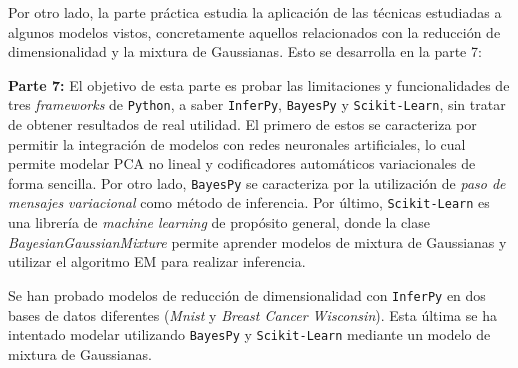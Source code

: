 Por otro lado, la parte práctica estudia la aplicación de las técnicas estudiadas a algunos modelos vistos, concretamente aquellos relacionados con la reducción de dimensionalidad y la mixtura de Gaussianas. Esto se desarrolla en la parte 7:

\textbf{Parte 7:} El objetivo de esta parte es probar las limitaciones y funcionalidades de tres \textit{frameworks} de \texttt{Python}, a saber \texttt{InferPy}, \texttt{BayesPy} y \texttt{Scikit-Learn}, sin tratar de obtener resultados de real utilidad. El primero de estos se caracteriza por permitir la integración de modelos con redes neuronales artificiales, lo cual permite modelar PCA no lineal y codificadores automáticos variacionales de forma sencilla. Por otro lado, \texttt{BayesPy} se caracteriza por la utilización de \emph{paso de mensajes variacional} como método de inferencia. Por último, \texttt{Scikit-Learn} es una librería de \emph{machine learning} de propósito general, donde la clase \emph{BayesianGaussianMixture} permite aprender modelos de mixtura de Gaussianas y utilizar el algoritmo EM para realizar inferencia.

Se han probado modelos de reducción de dimensionalidad con \texttt{InferPy} en dos bases de datos diferentes (\emph{Mnist} y \emph{Breast Cancer Wisconsin}). Esta última se ha intentado modelar utilizando \texttt{BayesPy} y \texttt{Scikit-Learn} mediante un modelo de mixtura de Gaussianas.
